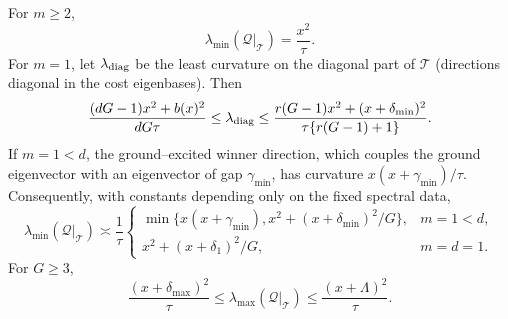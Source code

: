 \begin{lemma}
\label{lem:cond-hessian-sandwich}
For $m\ge2$,
\begin{equation}
 \lambda_{\min}(\mathcal Q|_{\mathcal T})=\frac{x^2}{\tau}.
 \label{eq:cond-min-degenerate}
\end{equation}
For $m=1$, let $\lambda_{\rm diag}$ be the least curvature on the diagonal
part of $\mathcal T$ (directions diagonal in the cost eigenbases).  Then
\begin{equation}
 \frac{(dG-1)x^2+b(x)^2}{dG\tau}
 \le\lambda_{\rm diag}\le
 \frac{r(G-1)x^2+(x+\delta_{\min})^2}
      {\tau\{r(G-1)+1\}}.                                  \label{eq:cond-diagonal-sandwich}
\end{equation}
If $m=1<d$, the ground--excited winner direction, which couples the ground
eigenvector with an eigenvector of gap $\gamma_{\min}$, has curvature
$x(x+\gamma_{\min})/\tau$.  Consequently, with constants depending only on
the fixed spectral data,
\begin{equation}
 \lambda_{\min}(\mathcal Q|_{\mathcal T})\asymp\frac1\tau
 \begin{cases}
 \min\{x(x+\gamma_{\min}),
        x^2+(x+\delta_{\min})^2/G\},&m=1<d,\\
 x^2+(x+\delta_1)^2/G,&m=d=1.
 \end{cases}                                                \label{eq:cond-min-simple}
\end{equation}
For $G\ge3$,
\begin{equation}
 \frac{(x+\delta_{\max})^2}{\tau}
 \le\lambda_{\max}(\mathcal Q|_{\mathcal T})
 \le\frac{(x+\Lambda)^2}{\tau}.                           \label{eq:cond-max-sandwich}
\end{equation}
\end{lemma}

